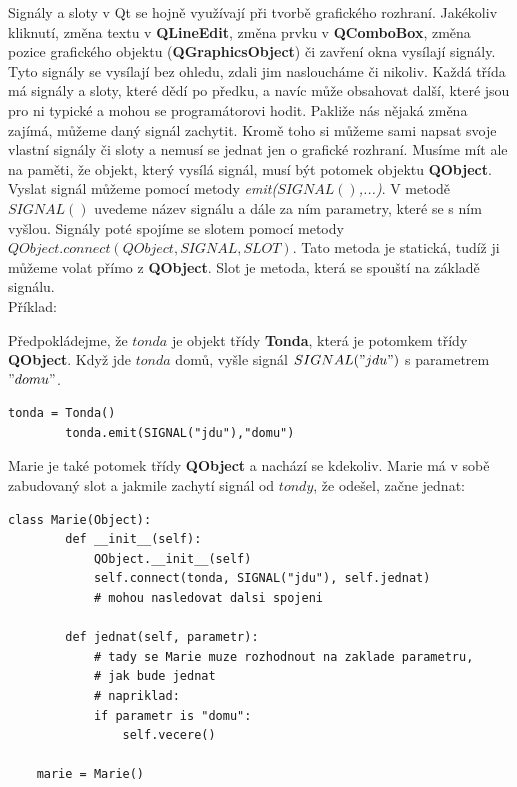 Signály a sloty v Qt se hojně využívají při tvorbě grafického
rozhraní. Jakékoliv kliknutí, změna textu v \textbf{QLineEdit}, změna
prvku v \textbf{QComboBox}, změna pozice grafického objektu
(\textbf{QGraphicsObject}) či zavření okna vysílají signály. Tyto
signály se vysílají bez ohledu, zdali jim nasloucháme či
nikoliv. Každá třída má signály a sloty, které dědí po předku, a navíc
může obsahovat další, které jsou pro ni typické a mohou se
programátorovi hodit. Pakliže nás nějaká změna zajímá, můžeme daný
signál zachytit. Kromě toho si můžeme sami napsat svoje vlastní
signály či sloty a nemusí se jednat jen o grafické rozhraní. Musíme
mít ale na paměti, že objekt, který vysílá signál, musí být potomek
objektu \textbf{QObject}. Vyslat signál můžeme pomocí
metody \textit{emit($SIGNAL()$,...)}. V metodě $SIGNAL()$ uvedeme
název signálu a dále za ním parametry, které se s ním vyšlou. Signály
poté spojíme se slotem pomocí metody $QObject.connect(QObject, SIGNAL,
SLOT)$. Tato metoda je statická, tudíž ji můžeme volat přímo
z \textbf{QObject}. Slot je metoda, která se spouští na základě
signálu.  \\

\noindent Příklad:

Předpokládejme, že $tonda$ je objekt třídy \textbf{Tonda}, která je
potomkem třídy \textbf{QObject}. Když jde $tonda$ domů, vyšle signál
$SIGNAL("jdu")$ s parametrem $"domu"$. \\

\newpage
\begin{lstlisting}[label=qtemit,caption={vyslání slotu pod názvem $"jdu"$ s atributem $"domu"$}]
		tonda = Tonda()
		tonda.emit(SIGNAL("jdu"),"domu")
\end{lstlisting}

Marie je také potomek třídy \textbf{QObject} a nachází se kdekoliv. Marie má v sobě zabudovaný slot a jakmile zachytí signál od $tondy$, že odešel, začne jednat: \\


\begin{lstlisting}[label=qtconnect,caption={zachycení signálu $"odesel"$ od tondy}, morekeywords={Marie, SIGNAL, QObject}]
	class Marie(Object):
		def __init__(self):
			QObject.__init__(self)
			self.connect(tonda, SIGNAL("jdu"), self.jednat)
			# mohou nasledovat dalsi spojeni
		
		def jednat(self, parametr):
			# tady se Marie muze rozhodnout na zaklade parametru, 
			# jak bude jednat
			# napriklad:
			if parametr is "domu":
				self.vecere()
		
	marie = Marie()
\end{lstlisting}

